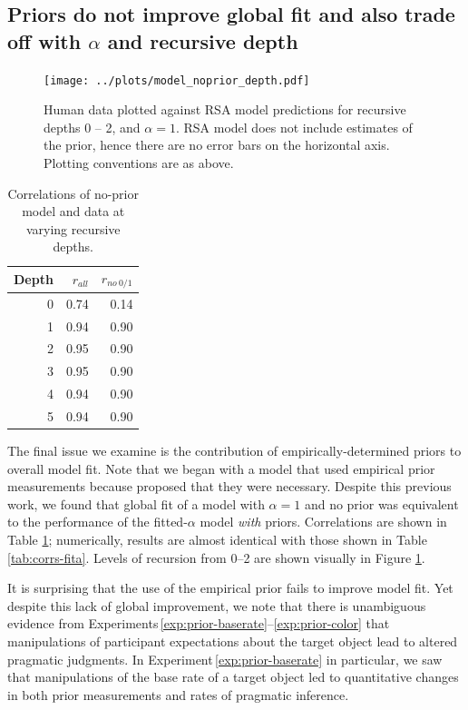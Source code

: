 \documentclass[man,noapacite]{apa2}
\newcounter{Experiment}
\newcommand{\exptref}[1]{Experiment\,\ref{#1}}
\newcommand{\exptrefrange}[2]{Experiments\,\ref{#1}--\ref{#2}}
\begin{document}
\subsection{Priors do not improve global fit and also trade off with $\alpha$ and recursive depth}

\begin{figure}[t]
 \centering
 \texttt{[image: ../plots/model\_noprior\_depth.pdf]}
 \caption{\label{fig:noprior} Human data plotted against RSA model predictions for recursive depths 0 -- 2, and $\alpha=1$. RSA model does not include estimates of the prior, hence there are no error bars on the horizontal axis. Plotting conventions are as above.}
\end{figure}

\begin{table}[ht]
\centering
\begin{tabular}{rrr}
  \hline
  Depth & $r_{all}$ & $r_{no~0/1}$ \\
  \hline
  0 & 0.74 & 0.14 \\
    1 & 0.94 & 0.90 \\
    2 & 0.95 & 0.90 \\
    3 & 0.95 & 0.90 \\
    4 & 0.94 & 0.90 \\
    5 & 0.94 & 0.90 \\
   \hline
\end{tabular}
\caption{\label{tab:corrs-noprior} Correlations of no-prior model and data at varying recursive depths.}
\end{table}

The final issue we examine is the contribution of empirically-determined priors to overall model fit. Note that we began with a model that used empirical prior measurements because  proposed that they were necessary. Despite this previous work, we found that global fit of a model with $\alpha=1$ and no prior was equivalent to the performance of the fitted-$\alpha$ model \emph{with} priors. Correlations are shown in Table \ref{tab:corrs-noprior}; numerically, results are almost identical with those shown in Table \ref{tab:corrs-fita}. Levels of recursion from 0--2 are shown visually in Figure \ref{fig:noprior}.

It is surprising that the use of the empirical prior fails to improve model fit. Yet despite this lack of global improvement, we note that there is unambiguous evidence from \exptrefrange{exp:prior-baserate}{exp:prior-color} that manipulations of participant expectations about the target object lead to altered pragmatic judgments. In \exptref{exp:prior-baserate} in particular, we saw that manipulations of the base rate of a target object led to quantitative changes in both prior measurements and rates of pragmatic inference.
\end{document}
